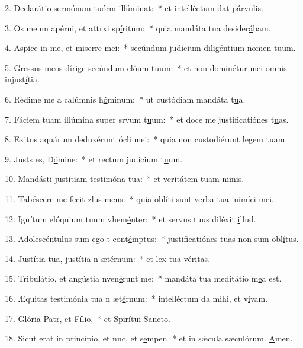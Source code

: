 2. Declarátio sermónum tuórm ill\uline{ú}minat:~* et intelléctum dat p\uline{á}rvulis.\par 
3. Os meum apérui, et attrxi sp\uline{í}ritum:~* quia mandáta tua desider\uline{á}bam.\par 
4. Aspice in me, et miserre m\uline{e}i:~* secúndum judícium diligéntium nomen t\uline{u}um.\par 
5. Gressus meos dírige secúndum elóum t\uline{u}um:~* et non dominétur mei omnis injust\uline{í}tia.\par 
6. Rédime me a calúmnis h\uline{ó}minum:~* ut custódiam mandáta t\uline{u}a.\par 
7. Fáciem tuam illúmina super srvum t\uline{u}um:~* et doce me justificatiónes t\uline{u}as.\par 
8. Exitus aquárum deduxérunt ócli m\uline{e}i:~* quia non custodiérunt legem t\uline{u}am.\par 
9. Justs es, D\uline{ó}mine:~* et rectum judícium t\uline{u}um.\par 
10. Mandásti justítiam testimóna t\uline{u}a:~* et veritátem tuam n\uline{i}mis.\par 
11. Tabéscere me fecit zlus m\uline{e}us:~* quia oblíti sunt verba tua inimíci m\uline{e}i.\par 
12. Ignítum elóquium tuum vhem\uline{é}nter:~* et servus tuus diléxit \uline{i}llud.\par 
13. Adolescéntulus sum ego t cont\uline{é}mptus:~* justificatiónes tuas non sum obl\uline{í}tus.\par 
14. Justítia tua, justítia n æt\uline{é}rnum:~* et lex tua v\uline{é}ritas.\par 
15. Tribulátio, et angústia nven\uline{é}runt me:~* mandáta tua meditátio m\uline{e}a est.\par 
16. Æquitas testimónia tua n æt\uline{é}rnum:~* intelléctum da mihi, et v\uline{i}vam.\par 
17. Glória Patr, et F\uline{í}lio,~* et Spirítui S\uline{a}ncto.\par 
18. Sicut erat in princípio, et nnc, et s\uline{e}mper,~* et in sǽcula sæculórum. \uline{A}men.\par 
